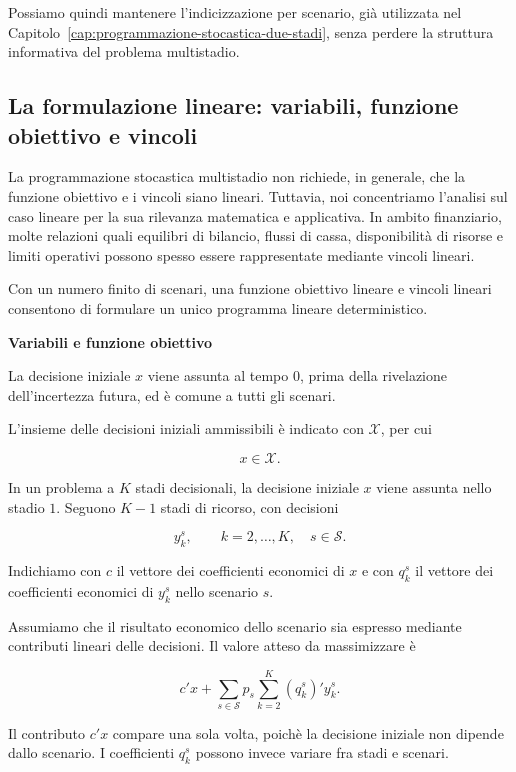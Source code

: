 Possiamo quindi mantenere l'indicizzazione
per scenario, gi\`a utilizzata
nel Capitolo~\ref{cap:programmazione-stocastica-due-stadi},
senza perdere la struttura informativa
del problema multistadio.


\subsection{La formulazione lineare: variabili,
funzione obiettivo e vincoli}

La programmazione stocastica multistadio
non richiede, in generale, che la funzione
obiettivo e i vincoli siano lineari.
Tuttavia, noi concentriamo l'analisi sul caso lineare
per la sua rilevanza matematica e applicativa. In ambito finanziario, molte relazioni quali
equilibri di bilancio, flussi di cassa,
disponibilit\`a di risorse e limiti
operativi possono spesso essere
rappresentate mediante vincoli lineari.

Con un numero finito di scenari,
una funzione obiettivo lineare e
vincoli lineari consentono di formulare
un unico programma lineare deterministico.


\medskip

\noindent
\textbf{Variabili e funzione obiettivo}

La decisione iniziale $x$ viene assunta
al tempo $0$, prima della rivelazione
dell'incertezza futura, ed \`e
comune a tutti gli scenari.

L'insieme delle decisioni iniziali
ammissibili \`e indicato con
$\mathcal X$, per cui

\[
x\in\mathcal X.
\]

In un problema a $K$ stadi decisionali, la decisione iniziale
$x$ viene assunta nello stadio $1$. Seguono $K-1$ stadi
di ricorso, con decisioni

\[
y_k^s,
\qquad k=2,\ldots,K,
\quad s\in\mathcal S.
\]

Indichiamo con $c$ il vettore
dei coefficienti economici di $x$
e con $q_k^s$ il vettore dei
coefficienti economici di $y_k^s$
nello scenario $s$.

Assumiamo che il risultato economico
dello scenario sia espresso mediante
contributi lineari delle decisioni.
Il valore atteso da massimizzare \`e

\[
c'x+
\sum_{s\in\mathcal S}p_s
\sum_{k=2}^{K}(q_k^s)'y_k^s.
\]

Il contributo $c'x$ compare una sola
volta, poich\`e la decisione iniziale
non dipende dallo scenario. I coefficienti
$q_k^s$ possono invece variare
fra stadi e scenari.

